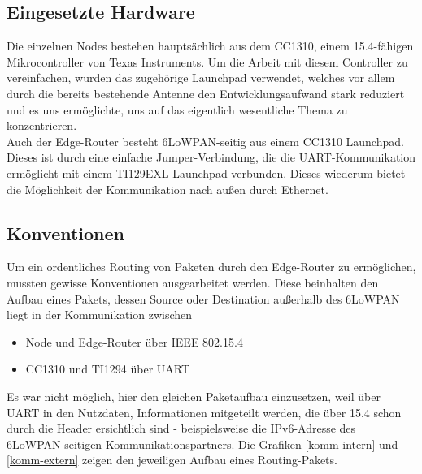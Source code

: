 \subsection{Eingesetzte Hardware}
Die einzelnen Nodes bestehen hauptsächlich aus dem CC1310, einem 15.4-fähigen Mikrocontroller von Texas Instruments. Um die Arbeit mit diesem Controller zu vereinfachen, wurden das zugehörige Launchpad verwendet, welches vor allem durch die bereits bestehende Antenne den Entwicklungsaufwand stark reduziert und es uns ermöglichte, uns auf das eigentlich wesentliche Thema zu konzentrieren. \\
Auch der Edge-Router besteht 6LoWPAN-seitig aus einem CC1310 Launchpad. Dieses ist durch eine einfache Jumper-Verbindung, die die UART-Kommunikation ermöglicht mit einem TI129EXL-Launchpad verbunden. Dieses wiederum bietet die Möglichkeit der Kommunikation nach außen durch Ethernet. 

\subsection{Konventionen}
Um ein ordentliches Routing von Paketen durch den Edge-Router zu ermöglichen, mussten gewisse Konventionen ausgearbeitet werden. Diese beinhalten den Aufbau eines Pakets, dessen Source oder Destination außerhalb des 6LoWPAN liegt in der Kommunikation zwischen
\begin{itemize}
	\item Node und Edge-Router über IEEE 802.15.4
	\item CC1310 und TI1294 über UART
\end{itemize}
Es war nicht möglich, hier den gleichen Paketaufbau einzusetzen, weil über UART in den Nutzdaten, Informationen mitgeteilt werden, die über 15.4 schon durch die Header ersichtlich sind - beispielsweise die IPv6-Adresse des 6LoWPAN-seitigen Kommunikationspartners. Die Grafiken \ref{komm-intern} und \ref{komm-extern} zeigen den jeweiligen Aufbau eines Routing-Pakets.

